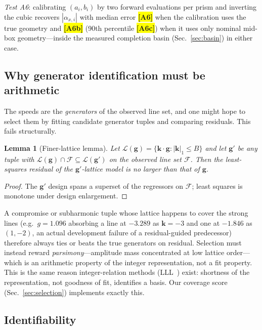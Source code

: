 \documentclass[twocolumn,preprintnumbers,amsmath,amssymb,pra,floatfix]{revtex4-2}
\newcommand{\vect}[1]{\bm{#1}}
\newtheorem{lemma}{Lemma}
\newcommand{\PH}[1]{\colorbox{yellow}{\textbf{\small [#1]}}}
\begin{document}
\emph{Test A6}: calibrating $(a_i,b_i)$ by two forward evaluations per
prism and inverting the cubic recovers $|\alpha_{x,i}|$ with median
error \PH{A6} when the calibration uses the true geometry and
\PH{A6b} (90th percentile \PH{A6c}) when it uses only nominal
mid-box geometry---inside the measured completion basin
(Sec.~\ref{sec:basin}) in either case.

\subsection{Why generator identification must be arithmetic}
\label{sec:finer}

The speeds are the \emph{generators} of the observed line set, and one
might hope to select them by fitting candidate generator tuples and
comparing residuals.  This fails structurally.

\begin{lemma}[Finer-lattice lemma]
\label{lem:finer}
Let $\mathcal{L}(\vect{g})=\{\vect{k}\cdot\vect{g}: |\vect{k}|_1\le B\}$
and let $\vect{g}'$ be any tuple with
$\mathcal{L}(\vect{g})\cap\mathcal{F}\subseteq\mathcal{L}(\vect{g}')$
on the observed line set $\mathcal{F}$.  Then the least-squares
residual of the $\vect{g}'$-lattice model is no larger than that of
$\vect{g}$.
\end{lemma}
\begin{proof}
The $\vect{g}'$ design spans a superset of the regressors on
$\mathcal{F}$; least squares is monotone under design enlargement.
\end{proof}

A compromise or subharmonic tuple whose lattice happens to cover the
strong lines (e.g.\ $g=1.096$ absorbing a line at $-3.289$ as
$\vect{k}=-3$ and one at $-1.846$ as $(1,-2)$, an actual development
failure of a residual-guided predecessor) therefore always ties or
beats the true generators on residual.  Selection must instead reward
\emph{parsimony}---amplitude mass concentrated at low lattice
order---which is an arithmetic property of the integer representation,
not a fit property.  This is the same reason integer-relation methods
(LLL~\cite{LLL1982}) exist: shortness of the representation, not
goodness of fit, identifies a basis.  Our coverage score
(Sec.~\ref{sec:selection}) implements exactly this.

\subsection{Identifiability}
\label{sec:identifiability}
\end{document}
